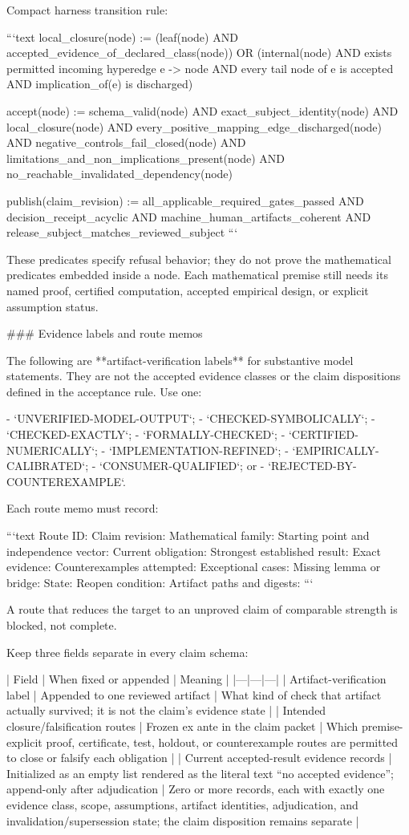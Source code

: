 \documentclass[11pt]{article}
\begin{document}
\begin{markdown}
Compact harness transition rule:

```text
local_closure(node) :=
  (leaf(node) AND accepted_evidence_of_declared_class(node))
  OR
  (internal(node)
   AND exists permitted incoming hyperedge e -> node
   AND every tail node of e is accepted
   AND implication_of(e) is discharged)

accept(node) :=
  schema_valid(node)
  AND exact_subject_identity(node)
  AND local_closure(node)
  AND every_positive_mapping_edge_discharged(node)
  AND negative_controls_fail_closed(node)
  AND limitations_and_non_implications_present(node)
  AND no_reachable_invalidated_dependency(node)

publish(claim_revision) :=
  all_applicable_required_gates_passed
  AND decision_receipt_acyclic
  AND machine_human_artifacts_coherent
  AND release_subject_matches_reviewed_subject
```

These predicates specify refusal behavior; they do not prove the mathematical predicates embedded
inside a node. Each mathematical premise still needs its named proof, certified computation,
accepted empirical design, or explicit assumption status.


### Evidence labels and route memos

The following are **artifact-verification labels** for substantive model statements. They are not
the accepted evidence classes or the claim dispositions defined in the acceptance rule. Use one:

- `UNVERIFIED-MODEL-OUTPUT`;
- `CHECKED-SYMBOLICALLY`;
- `CHECKED-EXACTLY`;
- `FORMALLY-CHECKED`;
- `CERTIFIED-NUMERICALLY`;
- `IMPLEMENTATION-REFINED`;
- `EMPIRICALLY-CALIBRATED`;
- `CONSUMER-QUALIFIED`; or
- `REJECTED-BY-COUNTEREXAMPLE`.

Each route memo must record:

```text
Route ID:
Claim revision:
Mathematical family:
Starting point and independence vector:
Current obligation:
Strongest established result:
Exact evidence:
Counterexamples attempted:
Exceptional cases:
Missing lemma or bridge:
State:
Reopen condition:
Artifact paths and digests:
```

A route that reduces the target to an unproved claim of comparable strength is blocked, not
complete.

Keep three fields separate in every claim schema:

| Field | When fixed or appended | Meaning |
|---|---|---|
| Artifact-verification label | Appended to one reviewed artifact | What kind of check that artifact actually survived; it is not the claim's evidence state |
| Intended closure/falsification routes | Frozen ex ante in the claim packet | Which premise-explicit proof, certificate, test, holdout, or counterexample routes are permitted to close or falsify each obligation |
| Current accepted-result evidence records | Initialized as an empty list rendered as the literal text “no accepted evidence”; append-only after adjudication | Zero or more records, each with exactly one evidence class, scope, assumptions, artifact identities, adjudication, and invalidation/supersession state; the claim disposition remains separate |


\end{markdown}
\end{document}
